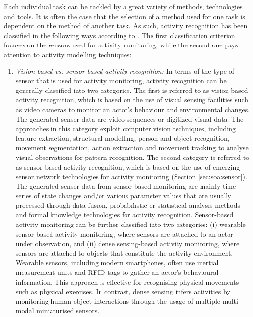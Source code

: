 Each individual task can be tackled by a great variety of methods, technologies and tools. It is often the case that the selection of a method used for one task is dependent on the method of another task. As such, activity recognition has been classified in the following ways according to \cite{Chen2012}. The first classification criterion focuses on the sensors used for activity monitoring, while the second one pays attention to activity modelling techniques:

\begin{enumerate}
 \item \textit{Vision-based vs. sensor-based activity recognition:} In terms of the type of sensor that is used for activity monitoring, activity recognition can be generally classified into two categories. The first is referred to as vision-based activity recognition, which is based on the use of visual sensing facilities such as video cameras to monitor an actor’s behaviour and environmental changes. The generated sensor data are video sequences or digitized visual data. The approaches in this category exploit computer vision techniques, including feature extraction, structural modelling, person and object recognition, movement segmentation, action extraction and movement tracking to analyse visual observations for pattern recognition. The second category is referred to as sensor-based activity recognition, which is based on the use of emerging sensor network technologies for activity monitoring (Section \ref{sec:soa:sensor}). The generated sensor data from sensor-based monitoring are mainly time series of state changes and/or various parameter values that are usually processed through data fusion, probabilistic or statistical analysis methods and formal knowledge technologies for activity recognition. Sensor-based activity monitoring can be further classified into two categories: (i) wearable sensor-based activity monitoring, where sensors are attached to an actor under observation, and (ii) dense sensing-based activity monitoring, where sensors are attached to objects that constitute the activity environment. Wearable sensors, including modern smartphones, often use inertial measurement units and RFID tags to gather an actor’s behavioural information. This approach is effective for recognising physical movements such as physical exercises. In contrast, dense sensing infers activities by monitoring human-object interactions through the usage of multiple multi-modal miniaturised sensors.


\end{enumerate}
